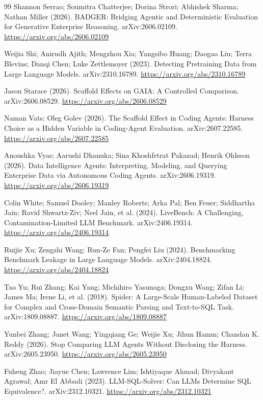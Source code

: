 \begin{thebibliography}{99}
 Shannon Serrao; Soumitra Chatterjee; Dorina Strori; Abhishek Sharma; Nathan Miller (2026). BADGER: Bridging Agentic and Deterministic Evaluation for Generative Enterprise Reasoning. arXiv:2606.02109. \url{https://arxiv.org/abs/2606.02109}

 Weijia Shi; Anirudh Ajith; Mengzhou Xia; Yangsibo Huang; Daogao Liu; Terra Blevins; Danqi Chen; Luke Zettlemoyer (2023). Detecting Pretraining Data from Large Language Models. arXiv:2310.16789. \url{https://arxiv.org/abs/2310.16789}

 Jason Starace (2026). Scaffold Effects on GAIA: A Controlled Comparison. arXiv:2606.08529. \url{https://arxiv.org/abs/2606.08529}

 Naman Vats; Oleg Golev (2026). The Scaffold Effect in Coding Agents: Harness Choice as a Hidden Variable in Coding-Agent Evaluation. arXiv:2607.22585. \url{https://arxiv.org/abs/2607.22585}

 Anoushka Vyas; Aarushi Dhanuka; Sina Khoshfetrat Pakazad; Henrik Ohlsson (2026). Data Intelligence Agents: Interpreting, Modeling, and Querying Enterprise Data via Autonomous Coding Agents. arXiv:2606.19319. \url{https://arxiv.org/abs/2606.19319}

 Colin White; Samuel Dooley; Manley Roberts; Arka Pal; Ben Feuer; Siddhartha Jain; Ravid Shwartz-Ziv; Neel Jain, et al. (2024). LiveBench: A Challenging, Contamination-Limited LLM Benchmark. arXiv:2406.19314. \url{https://arxiv.org/abs/2406.19314}

 Ruijie Xu; Zengzhi Wang; Run-Ze Fan; Pengfei Liu (2024). Benchmarking Benchmark Leakage in Large Language Models. arXiv:2404.18824. \url{https://arxiv.org/abs/2404.18824}

 Tao Yu; Rui Zhang; Kai Yang; Michihiro Yasunaga; Dongxu Wang; Zifan Li; James Ma; Irene Li, et al. (2018). Spider: A Large-Scale Human-Labeled Dataset for Complex and Cross-Domain Semantic Parsing and Text-to-SQL Task. arXiv:1809.08887. \url{https://arxiv.org/abs/1809.08887}

 Yunbei Zhang; Janet Wang; Yingqiang Ge; Weijie Xu; Jihun Hamm; Chandan K. Reddy (2026). Stop Comparing LLM Agents Without Disclosing the Harness. arXiv:2605.23950. \url{https://arxiv.org/abs/2605.23950}

 Fuheng Zhao; Jiayue Chen; Lawrence Lim; Ishtiyaque Ahmad; Divyakant Agrawal; Amr El Abbadi (2023). LLM-SQL-Solver: Can LLMs Determine SQL Equivalence?. arXiv:2312.10321. \url{https://arxiv.org/abs/2312.10321}

\end{thebibliography}
